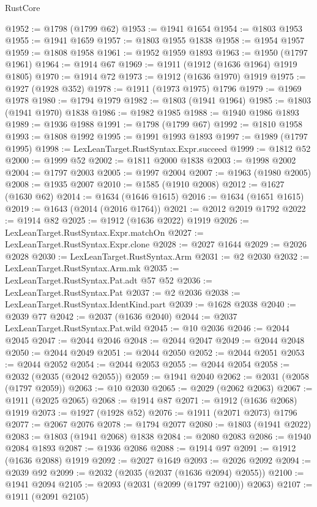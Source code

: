 \begin{lexlean}{RustCore}
\begin{coremodule}
@1952 := @1798 (@1799 @62)
@1953 := @1941 @1654
@1954 := @1803 @1953
@1955 := @1941 @1659
@1957 := @1803 @1955 @1838
@1958 := @1954 @1957
@1959 := @1808 @1958
@1961 := @1952 @1959 @1893
@1963 := @1950 (@1797 @1961)
@1964 := @1914 @67
@1969 := @1911 (@1912 (@1636 @1964) @1919 @1805)
@1970 := @1914 @72
@1973 := @1912 (@1636 @1970) @1919
@1975 := @1927 (@1928 @352)
@1978 := @1911 (@1973 @1975) @1796
@1979 := @1969 @1978
@1980 := @1794 @1979
@1982 := @1803 (@1941 @1964)
@1985 := @1803 (@1941 @1970) @1838
@1986 := @1982 @1985
@1988 := @1940 @1986 @1893
@1989 := @1936 @1988
@1991 := @1798 (@1799 @67)
@1992 := @1810 @1958
@1993 := @1808 @1992
@1995 := @1991 @1993 @1893
@1997 := @1989 (@1797 @1995)
@1998 := LexLeanTarget.RustSyntax.Expr.succeed
@1999 := @1812 @52
@2000 := @1999 @52
@2002 := @1811 @2000 @1838
@2003 := @1998 @2002
@2004 := @1797 @2003
@2005 := @1997 @2004
@2007 := @1963 (@1980 @2005)
@2008 := @1935 @2007
@2010 := @1585 (@1910 @2008)
@2012 := @1627 (@1630 @62)
@2014 := @1634 (@1646 @1615)
@2016 := @1634 (@1651 @1615)
@2019 := @1643 (@2014 (@2016 @1764))
@2021 := @2012 @2019 @1792
@2022 := @1914 @82
@2025 := @1912 (@1636 @2022) @1919
@2026 := LexLeanTarget.RustSyntax.Expr.matchOn
@2027 := LexLeanTarget.RustSyntax.Expr.clone
@2028 := @2027 @1644
@2029 := @2026 @2028
@2030 := LexLeanTarget.RustSyntax.Arm
@2031 := @2 @2030
@2032 := LexLeanTarget.RustSyntax.Arm.mk
@2035 := LexLeanTarget.RustSyntax.Pat.adt @57 @52
@2036 := LexLeanTarget.RustSyntax.Pat
@2037 := @2 @2036
@2038 := LexLeanTarget.RustSyntax.IdentKind.part
@2039 := @1628 @2038
@2040 := @2039 @77
@2042 := @2037 (@1636 @2040)
@2044 := @2037 LexLeanTarget.RustSyntax.Pat.wild
@2045 := @10 @2036
@2046 := @2044 @2045
@2047 := @2044 @2046
@2048 := @2044 @2047
@2049 := @2044 @2048
@2050 := @2044 @2049
@2051 := @2044 @2050
@2052 := @2044 @2051
@2053 := @2044 @2052
@2054 := @2044 @2053
@2055 := @2044 @2054
@2058 := @2032 (@2035 (@2042 @2055))
@2059 := @1941 @2040
@2062 := @2031 (@2058 (@1797 @2059))
@2063 := @10 @2030
@2065 := @2029 (@2062 @2063)
@2067 := @1911 (@2025 @2065)
@2068 := @1914 @87
@2071 := @1912 (@1636 @2068) @1919
@2073 := @1927 (@1928 @52)
@2076 := @1911 (@2071 @2073) @1796
@2077 := @2067 @2076
@2078 := @1794 @2077
@2080 := @1803 (@1941 @2022)
@2083 := @1803 (@1941 @2068) @1838
@2084 := @2080 @2083
@2086 := @1940 @2084 @1893
@2087 := @1936 @2086
@2088 := @1914 @97
@2091 := @1912 (@1636 @2088) @1919
@2092 := @2027 @1649
@2093 := @2026 @2092
@2094 := @2039 @92
@2099 := @2032 (@2035 (@2037 (@1636 @2094) @2055))
@2100 := @1941 @2094
@2105 := @2093 (@2031 (@2099 (@1797 @2100)) @2063)
@2107 := @1911 (@2091 @2105)

\end{coremodule}
\end{lexlean}
